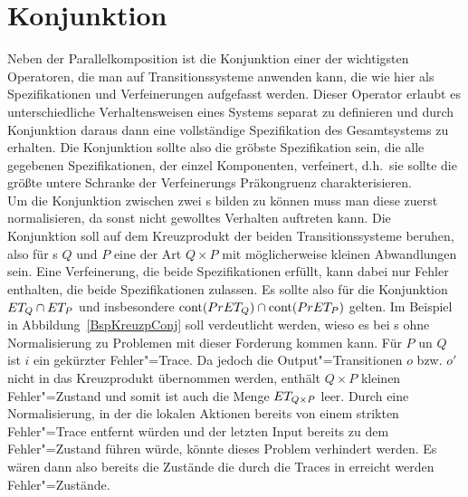 \section{Konjunktion}

Neben der Parallelkomposition ist die Konjunktion einer der wichtigsten
Operatoren, die man auf Transitionssysteme anwenden kann, die wie hier als
Spezifikationen und Verfeinerungen aufgefasst werden. Dieser Operator erlaubt
es unterschiedliche Verhaltensweisen eines Systems separat zu definieren und
durch Konjunktion daraus dann eine vollständige Spezifikation des Gesamtsystems
zu erhalten. Die Konjunktion sollte also die gröbste Spezifikation sein,
die alle gegebenen Spezifikationen, der einzel Komponenten, verfeinert, d.h.\
sie sollte die größte untere Schranke der Verfeinerungs Präkongruenz
charakterisieren.\\
Um die Konjunktion zwischen zwei \MEIO{}s bilden zu können muss man diese
zuerst normalisieren, da sonst nicht gewolltes Verhalten auftreten kann. Die
Konjunktion soll auf dem Kreuzprodukt der beiden Transitionssysteme beruhen,
also für \MEIO{}s $Q$ und $P$ eine \MEIO{} der Art $Q\times P$ mit
möglicherweise kleinen Abwandlungen sein. Eine Verfeinerung, die beide
Spezifikationen erfüllt, kann dabei nur Fehler enthalten, die beide
Spezifikationen zulassen. Es sollte also für die Konjunktion $ET _Q\cap ET
_P$ und insbesondere $\mathrm{cont} (PrET _Q)\cap \mathrm{cont} (PrET _P)$ gelten. Im
Beispiel in Abbildung~\ref{BspKreuzpConj} soll verdeutlicht werden, wieso es
bei \MEIO{}s ohne Normalisierung zu Problemen mit dieser Forderung kommen kann.
Für $P$ un $Q$ ist $i$ ein gekürzter Fehler"=Trace. Da jedoch die
Output"=Transitionen $o$ bzw. $o'$ nicht in das Kreuzprodukt übernommen werden,
enthält $Q\times P$ kleinen Fehler"=Zustand und somit ist auch die Menge $ET
_{Q\times P}$ leer. Durch eine Normalisierung, in der die lokalen Aktionen
bereits von einem strikten Fehler"=Trace entfernt würden und der letzten Input
bereits zu dem Fehler"=Zustand führen würde, könnte dieses Problem verhindert
werden. Es wären dann also bereits die Zustände die durch die Traces in \PrET{}
erreicht werden Fehler"=Zustände.

